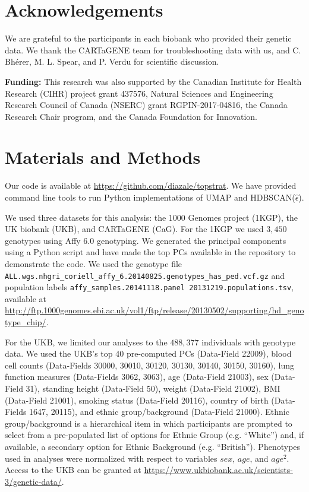 \section{Acknowledgements}
We are grateful to the participants in each biobank who provided their genetic data. We thank the CARTaGENE team for troubleshooting data with us, and C. Bh\'{e}rer, M. L. Spear, and P. Verdu for scientific discussion.

\textbf{Funding:} This research was also supported by the Canadian Institute for Health Research (CIHR) project grant 437576, Natural Sciences and Engineering Research Council of Canada (NSERC) grant RGPIN-2017-04816, the Canada Research Chair program, and the Canada Foundation for Innovation.

\section{Materials and Methods}
Our code is available at \url{https://github.com/diazale/topstrat}. We have provided command line tools to run Python implementations of UMAP and HDBSCAN($\hat{\epsilon}$).

We used three datasets for this analysis: the 1000 Genomes project (1KGP), the UK biobank (UKB), and CARTaGENE (CaG). For the 1KGP we used $3,450$ genotypes using Affy 6.0 genotyping\citep{global_2015}. We generated the principal components using a Python script and have made the top PCs available in the repository to demonstrate the code. We used the genotype file \verb|ALL.wgs.nhgri_coriell_affy_6.20140825.genotypes_has_ped.vcf.gz| and population labels \verb|affy_samples.20141118.panel 20131219.populations.tsv|,  available at \url{http://ftp.1000genomes.ebi.ac.uk/vol1/ftp/release/20130502/supporting/hd_genotype_chip/}.

For the UKB, we limited our analyses to the $488,377$ individuals with genotype data. We used the UKB's top 40 pre-computed PCs (Data-Field 22009), blood cell counts (Data-Fields 30000, 30010, 30120, 30130, 30140, 30150, 30160), lung function measures (Data-Fields 3062, 3063), age (Data-Field 21003), sex (Data-Field 31), standing height (Data-Field 50), weight (Data-Field 21002), BMI (Data-Field 21001), smoking status (Data-Field 20116), country of birth (Data-Fields 1647, 20115), and ethnic group/background (Data-Field 21000). Ethnic group/background is a hierarchical item in which participants are prompted to select from a pre-populated list of options for Ethnic Group (e.g. ``White'') and, if available, a secondary option for Ethnic Background (e.g. ``British''). Phenotypes used in analyses were normalized with respect to variables $sex$, $age$, and $age^2$. Access to the UKB can be granted at 
\url{https://www.ukbiobank.ac.uk/scientists-3/genetic-data/}.

